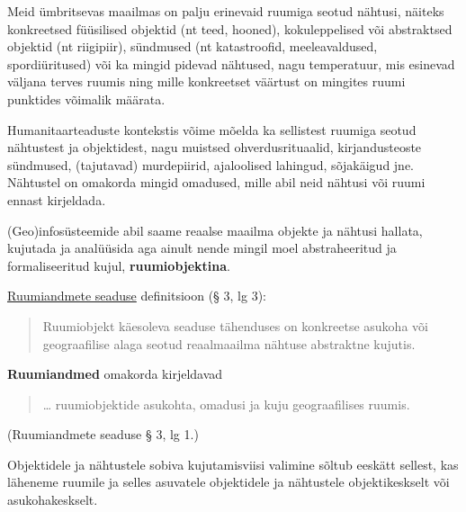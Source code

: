 \documentclass[
]{book}
\begin{document}
Meid ümbritsevas maailmas on palju erinevaid ruumiga seotud nähtusi, näiteks konkreetsed füüsilised objektid (nt teed, hooned), kokuleppelised või abstraktsed objektid (nt riigipiir), sündmused (nt katastroofid, meeleavaldused, spordiüritused) või ka mingid pidevad nähtused, nagu temperatuur, mis esinevad väljana terves ruumis ning mille konkreetset väärtust on mingites ruumi punktides võimalik määrata.

Humanitaarteaduste kontekstis võime mõelda ka sellistest ruumiga seotud nähtustest ja objektidest, nagu muistsed ohverdusrituaalid, kirjandusteoste sündmused, (tajutavad) murdepiirid, ajaloolised lahingud, sõjakäigud jne.\\
Nähtustel on omakorda mingid omadused, mille abil neid nähtusi või ruumi ennast kirjeldada.

(Geo)infosüsteemide abil saame reaalse maailma objekte ja nähtusi hallata, kujutada ja analüüsida aga ainult nende mingil moel abstraheeritud ja formaliseeritud kujul, \textbf{ruumiobjektina}.

\href{https://www.riigiteataja.ee/akt/RAS}{Ruumiandmete seaduse} definitsioon (§ 3, lg 3):

\begin{quote}
Ruumiobjekt käesoleva seaduse tähenduses on konkreetse asukoha või geograafilise alaga seotud reaalmaailma nähtuse abstraktne kujutis.
\end{quote}

\textbf{Ruumiandmed} omakorda kirjeldavad

\begin{quote}
\ldots{} ruumiobjektide asukohta, omadusi ja kuju geograafilises ruumis.
\end{quote}

(Ruumiandmete seaduse § 3, lg 1.)

Objektidele ja nähtustele sobiva kujutamisviisi valimine sõltub eeskätt sellest, kas läheneme ruumile ja selles asuvatele objektidele ja nähtustele objektikeskselt või asukohakeskselt.
\end{document}
